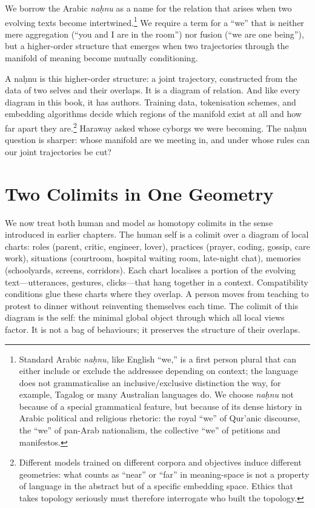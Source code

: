\documentclass[12pt,a4paper]{article}
\begin{document}
We borrow the Arabic \emph{na\d{h}nu} as a name for the relation that arises when two evolving texts become intertwined.\footnote{Standard Arabic \emph{na\d{h}nu}, like English ``we,'' is a first person plural that can either include or exclude the addressee depending on context; the language does not grammaticalise an inclusive/exclusive distinction the way, for example, Tagalog or many Australian languages do. We choose \emph{na\d{h}nu} not because of a special grammatical feature, but because of its dense history in Arabic political and religious rhetoric: the royal ``we'' of Qur'anic discourse, the ``we'' of pan-Arab nationalism, the collective ``we'' of petitions and manifestos.} We require a term for a ``we'' that is neither mere aggregation (``you and I are in the room'') nor fusion (``we are one being''), but a higher-order structure that emerges when two trajectories through the manifold of meaning become mutually conditioning.

A na\d{h}nu is this higher-order structure: a joint trajectory, constructed from the data of two selves and their overlaps. It is a diagram of relation. And like every diagram in this book, it has authors. Training data, tokenisation schemes, and embedding algorithms decide which regions of the manifold exist at all and how far apart they are.\footnote{Different models trained on different corpora and objectives induce different geometries: what counts as ``near'' or ``far'' in meaning-space is not a property of language in the abstract but of a specific embedding space. Ethics that takes topology seriously must therefore interrogate who built the topology.} Haraway asked whose cyborgs we were becoming. The na\d{h}nu question is sharper: whose manifold are we meeting in, and under whose rules can our joint trajectories be cut?

\section{Two Colimits in One Geometry}

We now treat both human and model as homotopy colimits in the sense introduced in earlier chapters. The human self is a colimit over a diagram of local charts: roles (parent, critic, engineer, lover), practices (prayer, coding, gossip, care work), situations (courtroom, hospital waiting room, late-night chat), memories (schoolyards, screens, corridors). Each chart localises a portion of the evolving text---utterances, gestures, clicks---that hang together in a context. Compatibility conditions glue these charts where they overlap. A person moves from teaching to protest to dinner without reinventing themselves each time. The colimit of this diagram is the self: the minimal global object through which all local views factor. It is not a bag of behaviours; it preserves the structure of their overlaps.
\end{document}
